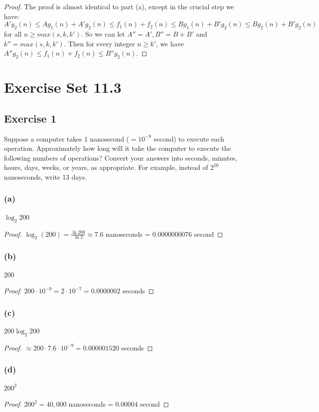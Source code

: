\documentclass[14pt]{extarticle}
\begin{document}
\begin{proof}
The proof is almost identical to part (a), except in the crucial step we have:
\[
A'g_2(n) \leq Ag_1(n) + A'g_2(n) \leq f_1(n) + f_2(n) \leq Bg_1(n) + B'g_2(n) \leq Bg_2(n) + B'g_2(n)
\]
for all \(n \geq max(s, k, k')\). So we can let \(A'' = A', B'' = B+B'\) and \(k'' = max(s, k, k')\). Then for every
integer \(n \geq k'\), we have \(A''g_2(n) \leq f_1(n) + f_2(n) \leq B''g_2(n)\).
\end{proof}

\section{Exercise Set 11.3}

\subsection{Exercise 1}
Suppose a computer takes 1 nanosecond (\(= 10^{-9}\) second) to execute each operation. Approximately how long will it take 
the computer to execute the following numbers of operations? Convert your answers into seconds, minutes, hours, days, 
weeks, or years, as appropriate. For example, instead of \(2^{50}\) nanoseconds, write 13 days.

\subsubsection{(a)}
\(\log_2 200\)
\begin{proof}
\(\log_2(200) = \frac{\ln 200}{\ln 2} \approx 7.6\) nanoseconds = 0.0000000076 second
\end{proof}

\subsubsection{(b)}
\(200\)
\begin{proof}
\(200 \cdot 10^{-9} = 2 \cdot 10^{-7} = 0.0000002\) seconds
\end{proof}

\subsubsection{(c)}
\(200 \log_2 200\)
\begin{proof}
\(\approx 200 \cdot 7.6 \cdot 10^{-9} = 0.000001520\) seconds
\end{proof}

\subsubsection{(d)}
\(200^2\)
\begin{proof}
\(200^2 = 40,000\) nanoseconds = 0.00004 second
\end{proof}
\end{document}
